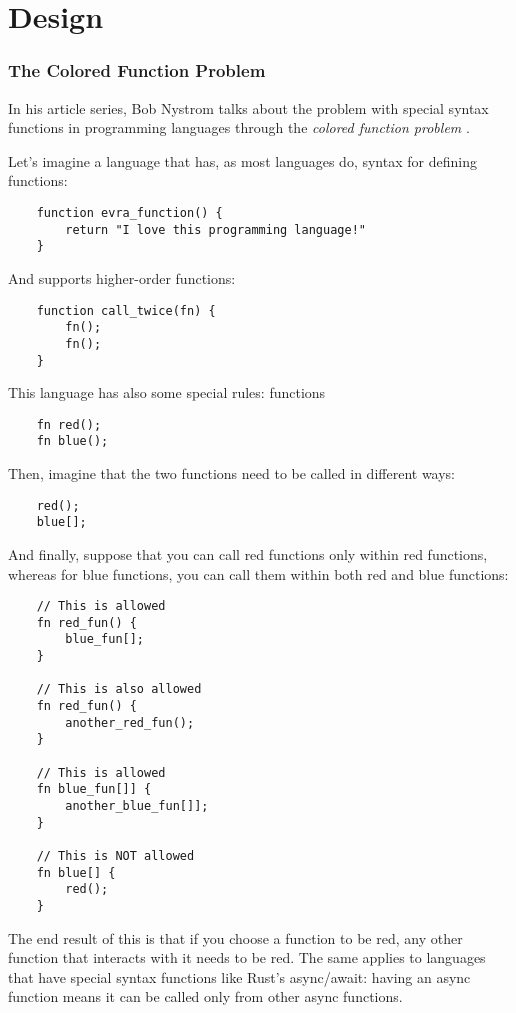 
\chapter{Design}
\label{chap:design}

\subsection*{The Colored Function Problem}
In his article series, Bob Nystrom talks about the problem with special syntax functions in programming languages through the \textit{colored function problem} \cite{003}.

Let's imagine a language that has, as most languages do, syntax for defining functions:

\begin{lstlisting}
    function evra_function() {
        return "I love this programming language!"
    }
\end{lstlisting}

And supports higher-order functions:

\begin{lstlisting}
    function call_twice(fn) {
        fn();
        fn();
    }
\end{lstlisting}

This language has also some special rules: functions 
\begin{lstlisting}
    fn red();
    fn blue();
\end{lstlisting}

Then, imagine that the two functions need to be called in different ways:

\begin{lstlisting}
    red();
    blue[];
\end{lstlisting}

And finally, suppose that you can call red functions only within red functions, whereas for blue functions, you can call them within both red and blue functions:

\begin{lstlisting}
    // This is allowed
    fn red_fun() {
        blue_fun[];
    }

    // This is also allowed
    fn red_fun() {
        another_red_fun();
    }

    // This is allowed
    fn blue_fun[]] {
        another_blue_fun[]];
    }

    // This is NOT allowed
    fn blue[] {
        red();
    }
\end{lstlisting}

The end result of this is that if you choose a function to be red, any other function that interacts with it needs to be red. The same applies to languages that have special syntax functions
like Rust's async/await: having an async function means it can be called only from other async functions.